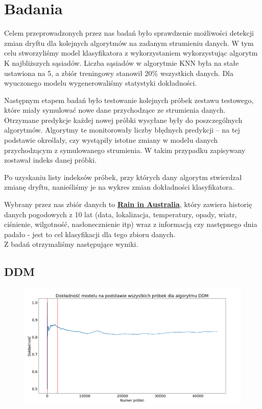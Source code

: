 \documentclass{classrep}
\begin{document}
\section{Badania}

Celem przeprowadzonych przez nas badań było sprawdzenie możliwości detekcji zmian dryftu dla kolejnych algorytmów na zadanym strumieniu danych. W tym celu stworzyliśmy model klasyfikatora z wykorzystaniem wykorzystując algorytm K najbliższych sąsiadów. Liczba sąsiadów w algorytmie KNN była na stałe ustawiona na 5, a zbiór treningowy stanowił 20\% wszystkich danych. Dla wyuczonego modelu wygenerowaliśmy statystyki dokładności. 

Następnym etapem badań było testowanie kolejnych próbek zestawu testowego, które miały symulować nowe dane przychodzące ze strumienia danych. Otrzymane predykcje każdej nowej próbki wysyłane były do poszczególnych algorytmów. Algorytmy te monitorowały liczby błędnych predykcji -- na tej podstawie określały, czy wystąpiły istotne zmiany w modelu danych przychodzącym z symulowanego strumienia. W takim przypadku zapisywany zostawał indeks danej próbki. 

Po uzyskaniu listy indeksów próbek, przy których dany algorytm stwierdzał zmianę dryftu, nanieśliśmy je na wykres zmian dokładności klasyfikatora.

Wybrany przez nas zbiór danych to \href{https://www.kaggle.com/jsphyg/weather-dataset-rattle-package}{\textbf{Rain in Australia}}, który zawiera historię danych pogodowych z 10 lat (data, lokalizacja, temperatury, opady, wiatr, ciśnienie, wilgotność, nasłonecznienie itp) wraz z informacją czy następnego dnia padało - jest to cel klasyfikacji dla tego zbioru danych.\\

Z badań otrzymaliśmy następujące wyniki.

\subsection{DDM}

\begin{figure}[H]
    \centering
    \includegraphics[width=1\textwidth]{resources/stage1/DDM.png}
    \label{DDM}
\end{figure}
\end{document}

